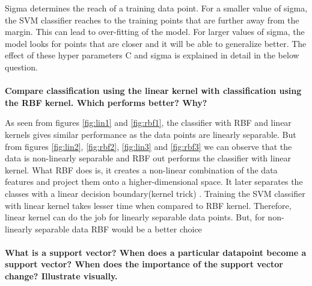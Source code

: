 {Sigma determines the reach of a training data point. For a smaller value of sigma, the SVM classifier reaches to the training points that are further away from the margin. This can lead to over-fitting of the model. For larger values of sigma, the model looks for points that are closer and it will be able to generalize better. The effect of these hyper parameters C and sigma is explained in detail in the below question.\\\\
\textbf{Compare classification using the linear kernel with classification using the RBF kernel. Which performs better? Why?}
 	 
 	 As seen from figures \ref{fig:lin1} and \ref{fig:rbf1}, the classifier with RBF and linear kernels gives similar performance as the data points are linearly separable. But from figures \ref{fig:lin2}, \ref{fig:rbf2}, \ref{fig:lin3} and \ref{fig:rbf3} we can observe that the data is non-linearly separable and RBF out performs the classifier with linear kernel. What RBF does is, it creates a non-linear combination of the data features and project them onto a higher-dimensional space. It later separates the classes with a linear decision boundary(kernel trick) . Training the SVM classifier with linear kernel takes lesser time when compared to RBF kernel. Therefore, linear kernel can do the job for linearly separable data points. But, for non-linearly separable data RBF would be a better choice \\\\
\textbf{ What is a support vector? When does a particular datapoint become a support vector? When does the importance of the support vector change? Illustrate visually.}
	
}
